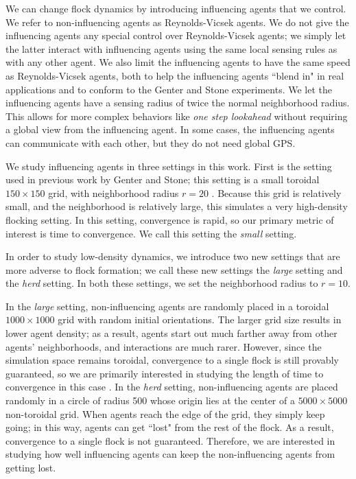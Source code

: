 We can change flock dynamics by introducing influencing agents that we control.
We refer to non-influencing agents as Reynolds-Vicsek agents.
We do not give the influencing agents any special control over Reynolds-Vicsek
agents; we simply let the latter interact with influencing agents using the
same local sensing rules as with any other agent.
We also limit the influencing agents to have the same speed as Reynolds-Vicsek
agents, both to help the influencing agents ``blend in" in real applications
and to conform to the Genter and Stone experiments.
We let the influencing agents have a sensing radius of twice the normal
neighborhood radius.
This allows for more complex behaviors like \textit{one step lookahead}
without requiring a global view from the influencing agent.
In some cases, the influencing agents can communicate with each other, but
they do not need global GPS.

We study influencing agents in three settings in this work.
First is the setting used in previous work by Genter and Stone; this setting
is a small toroidal $150\times150$ grid, with neighborhood radius $r=20$
\cite{genter2016facegoalfacecurrent, genter201612steplookahead, genterthesis}.
Because this grid is relatively small, and the neighborhood is relatively
large, this simulates a very high-density flocking setting.
In this setting, convergence is rapid, so our primary metric of interest is
time to convergence.
We call this setting the \textit{small} setting.

In order to study low-density dynamics, we introduce two new settings that are
more adverse to flock formation; we call these new settings the \textit{large}
setting and the \textit{herd} setting.
In both these settings, we set the neighborhood radius to $r=10$.

In the \textit{large} setting, non-influencing agents are randomly placed in a
toroidal $1000\times1000$ grid with random initial orientations.
The larger grid size results in lower agent density; as a result, agents start
out much farther away from other agents' neighborhoods, and interactions are
much rarer.
However, since the simulation space remains toroidal, convergence to a single
flock is still provably guaranteed, so we are primarily interested in
studying the length of time to convergence in this case
\cite{jad2003convergence}.
In the \textit{herd} setting, non-influencing agents are placed randomly in a
circle of radius 500 whose origin lies at the center of a $5000\times5000$
non-toroidal grid.
When agents reach the edge of the grid, they simply keep going; in this way,
agents can get ``lost" from the rest of the flock.
As a result, convergence to a single flock is not guaranteed.
Therefore, we are interested in studying how well influencing agents can keep
the non-influencing agents from getting lost.
